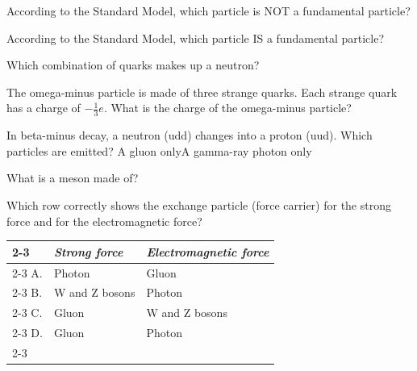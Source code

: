 
\begin{quizq}{}
According to the Standard Model, which particle is NOT a fundamental particle?
\end{quizq}

\begin{quizq}{}
According to the Standard Model, which particle IS a fundamental particle?
\end{quizq}

\begin{quizq}{}
Which combination of quarks makes up a neutron?
\end{quizq}

\begin{quizq}{}
The omega-minus particle is made of three strange quarks. Each strange quark has a charge of
$-\frac{1}{3}e$. What is the charge of the omega-minus particle?
\end{quizq}

\begin{quizq}{}
In beta-minus decay, a neutron (udd) changes into a proton (uud). Which particles are emitted?
  {A gluon only}{A gamma-ray photon only}
\end{quizq}

\begin{quizq}{}
What is a meson made of?
\end{quizq}

\begin{quizq}{}
Which row correctly shows the exchange particle (force carrier) for the strong force and for the
electromagnetic force?
\begin{center}
  \renewcommand\arraystretch{1.7}
  \begin{tabular}{@{}p{10mm}|>{\centering\arraybackslash}p{45mm}|>{\centering\arraybackslash}p{45mm}|}
    \cline{2-3}
    & \textit{Strong force} & \textit{Electromagnetic force}\\ \cline{2-3}
    A. & Photon & Gluon\\ \cline{2-3}
    B. & W and Z bosons & Photon\\ \cline{2-3}
    C. & Gluon & W and Z bosons\\ \cline{2-3}
    D. & Gluon & Photon\\ \cline{2-3}
  \end{tabular}
\end{center}
\end{quizq}


